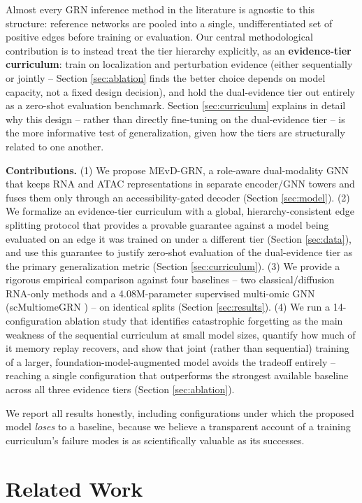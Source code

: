 \documentclass{article}
\theoremstyle{plain}
\theoremstyle{definition}
\begin{document}
Almost every GRN inference method in the literature is agnostic to this
structure: reference networks are pooled into a single, undifferentiated set of
positive edges before training or evaluation. Our central methodological
contribution is to instead treat the tier hierarchy explicitly, as an
\textbf{evidence-tier curriculum}: train on localization and perturbation
evidence (either sequentially or jointly -- Section \ref{sec:ablation} finds
the better choice depends on model capacity, not a fixed design decision),
and hold the dual-evidence tier out entirely as a zero-shot evaluation
benchmark. Section \ref{sec:curriculum} explains in detail why this design --
rather than directly fine-tuning on the dual-evidence tier -- is the more
informative test of generalization, given how the tiers are structurally
related to one another.

\textbf{Contributions.} (1) We propose MEvD-GRN, a role-aware dual-modality GNN
that keeps RNA and ATAC representations in separate encoder/GNN towers and fuses
them only through an accessibility-gated decoder (Section \ref{sec:model}). (2)
We formalize an evidence-tier curriculum with a global, hierarchy-consistent edge
splitting protocol that provides a provable guarantee against a model being
evaluated on an edge it was trained on under a different tier (Section
\ref{sec:data}), and use this guarantee to justify zero-shot evaluation of the
dual-evidence tier as the primary generalization metric (Section
\ref{sec:curriculum}). (3) We provide a rigorous empirical comparison against
four baselines -- two classical/diffusion RNA-only methods and a
4.08M-parameter supervised multi-omic GNN (scMultiomeGRN
\cite{xu2025scmultiomegrn}) -- on identical splits (Section \ref{sec:results}).
(4) We run a 14-configuration ablation study that identifies catastrophic
forgetting as the main weakness of the sequential curriculum at small model
sizes, quantify how much of it memory replay recovers, and show that joint
(rather than sequential) training of a larger, foundation-model-augmented
model avoids the tradeoff entirely -- reaching a single configuration that
outperforms the strongest available baseline across all three evidence tiers
(Section \ref{sec:ablation}).

We report all results honestly, including configurations under which the
proposed model \emph{loses} to a baseline, because we believe a transparent
account of a training curriculum's failure modes is as scientifically valuable
as its successes.

\section{Related Work}
\label{sec:related}
\end{document}
